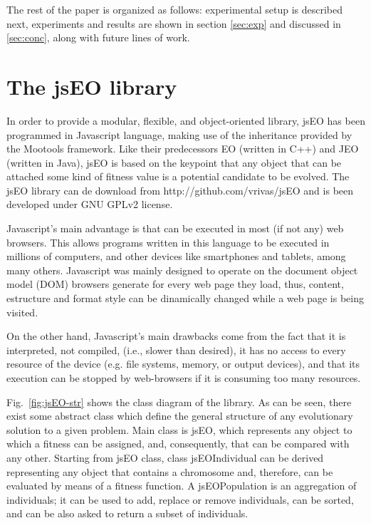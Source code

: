 \documentclass{llncs}
\begin{document}
The rest of the paper is organized as follows: experimental setup is described next,  experiments and results are shown in section 
\ref{sec:exp} and discussed in \ref{sec:conc}, along with future lines
of work. 

\section{The jsEO library}
\label{sec:jseo}
In order to provide a modular, flexible, and object-oriented library, jsEO has been programmed in Javascript language, making use of the inheritance provided by the Mootools framework. Like their predecessors EO (written in C++) and JEO (written in Java), jsEO is based on the keypoint that any object that can be attached some kind of fitness value is a potential candidate to be evolved. The jsEO library can de download from http://github.com/vrivas/jsEO and is been developed under GNU GPLv2 license.

Javascript's main advantage is that can be executed in most (if not any) web browsers. This allows programs written in this language to be executed in millions of computers, and other devices like smartphones and tablets, among many others. Javascript was mainly designed to operate on the document object model (DOM) browsers generate for every web page they load, thus, content, estructure and format style can be dinamically changed while a web page is being visited.

On the other hand, Javascript's main drawbacks come from the fact that it is interpreted, not compiled, (i.e., slower than desired), it has no access to every resource of the device (e.g. file systems,  memory, or output devices), and that its execution can be stopped by web-browsers if it is consuming too many resources.

Fig.~\ref{fig:jsEO-str} shows the class diagram of the library. As can be seen, there exist some abstract class which define the general structure of any evolutionary solution to a given problem. Main class is jsEO, which represents any object to which a fitness can be assigned, and, consequently, that can be compared with any other. Starting from jsEO class, class jsEOIndividual can be derived representing any object that contains a chromosome and, therefore, can be evaluated by means of a fitness function. A jsEOPopulation is an aggregation of individuals; it can be used to add, replace or remove individuals, can be sorted, and can be also asked to return a subset of individuals.
\end{document}
